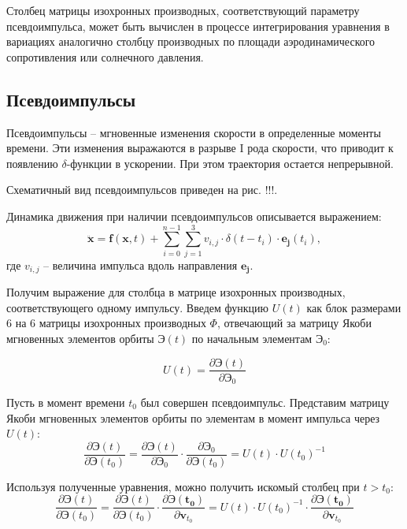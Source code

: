 Столбец матрицы изохронных производных, соответствующий параметру псевдоимпульса,
может быть вычислен в процессе интегрирования уравнения в вариациях аналогично
столбцу производных по площади аэродинамического сопротивления или солнечного давления.

\subsection{Псевдоимпульсы}

Псевдоимпульсы -- мгновенные изменения скорости в определенные моменты времени.
Эти изменения выражаются в разрыве I рода скорости, что приводит к появлению
$\delta$-функции в ускорении. При этом траектория остается непрерывной.

Схематичный вид псевдоимпульсов приведен на рис. !!!.

Динамика движения при наличии псевдоимпульсов описывается выражением:
\begin{equation*}
    \ddot{\mathbf{x}} = \mathbf{f}(\mathbf{x}, t) +
        \sum_{i=0}^{n-1} \sum_{j=1}^{3} v_{i,j} 
                    \cdot \delta (t - t_i) \cdot \mathbf{e_j} (t_i),
\end{equation*}
где $v_{i,j}$ -- величина импульса вдоль направления $\mathbf{e_j}$.

Получим выражение для столбца в матрице изохронных производных, соответствующего одному импульсу.
Введем функцию $U(t)$ как блок размерами 6 на 6 матрицы изохронных производных $\Phi$, отвечающий за
матрицу Якоби мгновенных элементов орбиты $\mathbf{\textbf{Э}}(t)$ по начальным элементам 
$\mathbf{\textbf{Э}}_0$:

\begin{equation*}
    U(t) = \frac{\partial \mathbf{\textbf{Э}}(t)}{\partial \mathbf{\textbf{Э}}_0}
\end{equation*}

Пусть в момент времени $t_0$ был совершен псевдоимпульс.
Представим матрицу Якоби мгновенных элементов орбиты по элементам в момент импульса через $U(t)$:
\begin{equation*}
    \frac{\partial \mathbf{\textbf{Э}}(t)}{\partial \mathbf{\textbf{Э}}(t_0)} = 
    \frac{\partial \mathbf{\textbf{Э}}(t)}{\partial \mathbf{\textbf{Э}}_0} \cdot
    \frac{\partial \mathbf{\textbf{Э}}_0}{\partial \mathbf{\textbf{Э}}(t_0)} = 
    U(t) \cdot U(t_0)^{-1}
\end{equation*}

Используя полученные уравнения, можно получить искомый столбец при $t > t_0$:
\begin{equation*}
    \frac{\partial \mathbf{\textbf{Э}}(t)}{\partial \mathbf{\textbf{Э}}(t_0)} = 
    \frac{\partial \mathbf{\textbf{Э}}(t)}{\partial \mathbf{\textbf{Э}}(t_0)} \cdot
    \frac{\partial \mathbf{\textbf{Э}(t_0)}}{\partial \mathbf{v}_{t_0}} =
    U(t) \cdot U(t_0)^{-1} \cdot
    \frac{\partial \mathbf{\textbf{Э}(t_0)}}{\partial \mathbf{v}_{t_0}}
\end{equation*}

